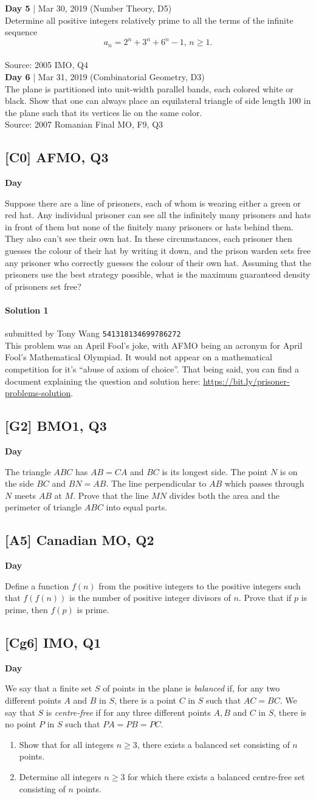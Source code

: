 \documentclass{article}
\newcommand{\themonth}{April}
\newcommand{\theyear}{2019}
\newcounter{day}
\newcounter{solution}
\newcommand{\oproblem}[6]{
\newpage
\textbf{Day #1} | #2 (#5, D#6)\\
#4 \\
Source: #3\\
}
\newcommand{\problem}[4][0]{
	\newpage
	\subsection{[#3] \space #2} \hfill 
	{\large\textbf{Day \arabic{day}}} %
	\begin{flushleft} #4 \end{flushleft}
	\vspace{1em}
	\addtocounter{day}{1}
	\setcounter{solution}{1}
}
\newcommand{\solution}[4]{
\paragraph{Solution #1} \hfill submitted by #2 \hfill \texttt{#3}\\
#4\\
}
\begin{document}
\oproblem{5}{Mar 30, 2019}{2005 IMO, Q4}{Determine all positive integers relatively prime to all the terms of the infinite sequence \[a_n=2^n+3^n+6^n -1,\, n\geq 1.\]}{Number Theory}{5}

\oproblem{6}{Mar 31, 2019}{2007 Romanian Final MO, F9, Q3}{The plane is partitioned into unit-width parallel bands, each colored white or black. Show that one can always place an equilateral triangle of side length 100 in the plane such that its vertices lie on the same color.}{Combinatorial Geometry}{3}

\problem[7]{2019 AFMO, Q3}{C0}{Suppose there are a line of prisoners, each of whom is wearing either a green or red hat. Any individual prisoner can see all the infinitely many prisoners and hats in front of them but none of the finitely many prisoners or hats behind them. They also can't see their own hat. In these circumstances, each prisoner then guesses the colour of their hat by writing it down, and the prison warden sets free any prisoner who correctly guesses the colour of their own hat. Assuming that the prisoners use the best strategy possible, what is the maximum guaranteed density of prisoners set free?}

\solution{1}{Tony Wang}{541318134699786272}{This problem was an April Fool's joke, with AFMO being an acronym for April Fool's Mathematical Olympiad. It would not appear on a mathematical competition for it's ``abuse of axiom of choice''. That being said, you can find a document explaining the question and solution here: \url{https://bit.ly/prisoner-problems-solution}.}

\problem[8]{2017 BMO1, Q3}{G2}{The triangle $ABC$ has $AB = CA$ and $BC$ is its longest side. The point $N$ is on the side $BC$ and $BN = AB$. The line perpendicular to $AB$ which passes through $N$ meets $AB$ at $M$. Prove that the line $MN$ divides both the area and the perimeter of triangle $ABC$ into equal parts.}

\problem[9]{2017 Canadian MO, Q2}{A5}{Define a function $f(n)$ from the positive integers to the positive integers such that $f(f(n))$ is the number of positive integer divisors of $n$. Prove that if $p$ is prime, then $f(p)$ is prime.}

\problem[10]{2015 IMO, Q1}{Cg6}{We say that a finite set $S$ of points in the plane is \textit{balanced} if, for any two different points $A$ and $B$ in $S$, there is a point $C$ in $S$ such that $AC = BC$. We say that $S$ is \emph{centre-free} if for any three different points $A, B$ and $C$ in $S$, there is no point $P$ in $S$ such that $PA = PB = PC$. \begin{enumerate} \item Show that for all integers $n \geq 3$, there exists a balanced set consisting of $n$ points.\item Determine all integers $n \geq 3$ for which there exists a balanced centre-free set consisting of $n$ points.\end{enumerate}}
\end{document}

